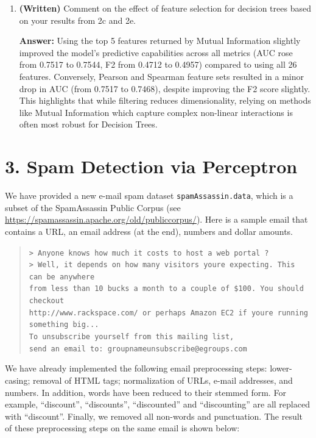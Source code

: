 \documentclass[11pt]{article}
\begin{document}
\begin{enumerate}[label=(\alph*)]
    \item[(f)] \textbf{(Written)} Comment on the effect of feature selection for decision trees based on your results from 2c and 2e.
    
    \textbf{Answer:} Using the top 5 features returned by Mutual Information slightly improved the model's predictive capabilities across all metrics (AUC rose from 0.7517 to 0.7544, F2 from 0.4712 to 0.4957) compared to using all 26 features. Conversely, Pearson and Spearman feature sets resulted in a minor drop in AUC (from 0.7517 to 0.7468), despite improving the F2 score slightly. This highlights that while filtering reduces dimensionality, relying on methods like Mutual Information which capture complex non-linear interactions is often most robust for Decision Trees.
\end{enumerate}

\section*{3. Spam Detection via Perceptron}

We have provided a new e-mail spam dataset \texttt{spamAssassin.data}, which is a subset of the SpamAssassin Public Corpus (see \url{https://spamassassin.apache.org/old/publiccorpus/}). Here is a sample email that contains a URL, an email address (at the end), numbers and dollar amounts.

\begin{quote}
\texttt{> Anyone knows how much it costs to host a web portal ?\\
> Well, it depends on how many visitors youre expecting. This can be anywhere\\
from less than 10 bucks a month to a couple of \$100. You should checkout\\
http://www.rackspace.com/ or perhaps Amazon EC2 if youre running something big...\\
To unsubscribe yourself from this mailing list,\\
send an email to: groupnameunsubscribe@egroups.com}
\end{quote}

We have already implemented the following email preprocessing steps: lower-casing; removal of HTML tags; normalization of URLs, e-mail addresses, and numbers. In addition, words have been reduced to their stemmed form. For example, ``discount'', ``discounts'', ``discounted'' and ``discounting'' are all replaced with ``discount''. Finally, we removed all non-words and punctuation. The result of these preprocessing steps on the same email is shown below:
\end{document}
